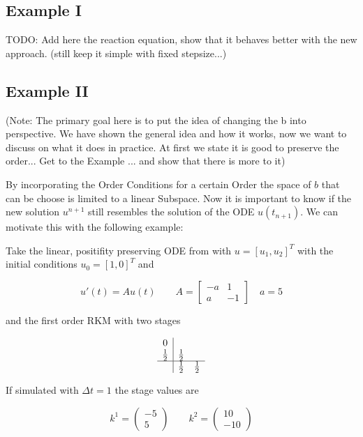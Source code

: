 \documentclass{article}
\begin{document}
\subsection{Example I}\label{sec:example_reac}

TODO: Add here the reaction equation, show that it behaves better with the new approach. (still keep it simple with fixed stepsize...)

\subsection{Example II}\label{sec:example_lin}

(Note: The primary goal here is to put the idea of changing the b into perspective. We have shown the general idea and how it works, now we want to discuss on what it does in practice. At first we state it is good to preserve the order... Get to the Example ... and show that there is more to it)

By incorporating the Order Conditions for a certain Order the space of $b$ that can be choose is limited to a linear Subspace. 
Now it is important to know if the new solution $u^{n+1}$ still resembles the solution of the ODE $u(t_{n+1})$. 
We can motivate this with the following example:

Take the linear, positifity preserving ODE from \cite{kopecz_unconditionally_2018} with $u = [u_1,u_2]^T$ with the initial conditions $u_0 = [1,0]^T$ and

\begin{equation}
u'(t) = A u(t) \qquad A = \left[\begin{matrix}- a & 1\\a & -1\end{matrix}\right] \quad a =5
\end{equation}

and the first order RKM with two stages

\begin{align}
\begin{array}{c|cc}
0 &  & \\
\frac{1}{2} & \frac{1}{2} & \\
\hline
 & \frac{1}{2} & \frac{1}{2}\\
\end{array}
\end{align}

If simulated with $\Delta t = 1$ the stage values are 

\begin{equation}
k^1 = \left(\begin{matrix}-5\\5\end{matrix}\right) \qquad k^2 = \left(\begin{matrix}10\\-10\end{matrix}\right)
\end{equation}
\end{document}
